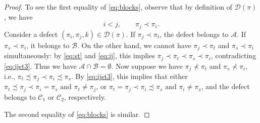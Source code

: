 \documentclass[12pt]{amsart}
\theoremstyle{definition}
\numberwithin{equation}{section}
\newcommand{\A}{\mathcal{A}}
\newcommand{\B}{\mathcal{B}}
\newcommand{\C}{\mathcal{C}}
\newcommand{\D}{\mathcal{D}}
\begin{document}
\begin{proof}


To see the first equality of \eqref{eq:blocks}, observe that by definition of $\D(\pi)$, we have 
\begin{equation}\label{eq:ij}
    i<j, \qquad \pi_j\prec \pi_i. 
\end{equation}
Consider a defect $(\pi_i, \pi_j, k) \in \D(\pi)$. If $\pi_j\prec \pi_t$, the defect belongs to $\A$. If $\pi_s\prec\pi_i$, it belongs to $\B$. On the other hand, we cannot have $\pi_j\prec \pi_t$ and $\pi_s\prec \pi_i$ simultaneously: by \eqref{eq:st} and \eqref{eq:ij}, this implies $\pi_j\prec \pi_t\prec\pi_s\prec \pi_i$, contradicting \eqref{eq:ijst3}. Thus we have $\A\cap \B=\emptyset$. Now suppose we have $\pi_j\not\prec\pi_t$ and $\pi_s\not\prec\pi_i$, i.e., $\pi_t\precsim \pi_j\prec\pi_i\precsim \pi_s$. By \eqref{eq:ijst3}, this implies that either $\pi_t\precsim\pi_j\prec \pi_i=\pi_s \text{ and } \pi_t\neq \pi_j$, or $\pi_t=\pi_j\prec \pi_i\precsim \pi_s \text{ and } \pi_i\neq \pi_s$, and the defect belongs to $\C_1$ or $\C_2$, respectively.

The second equality of \eqref{eq:blocks} is similar.
\end{proof}
\end{document}
